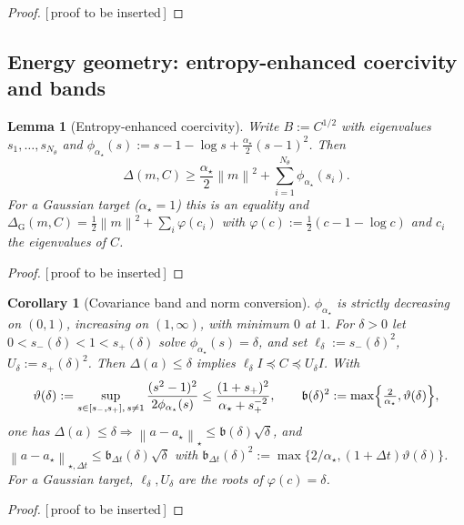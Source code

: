 \documentclass[11pt]{article}
\theoremstyle{plain}
\newtheorem{lemma}[lemma]{Lemma}
\newtheorem{corollary}[corollary]{Corollary}
\theoremstyle{definition}
\theoremstyle{remark}
\newcommand{\Id}{I}
\newcommand{\norm}[1]{\left\lVert #1\right\rVert}
\newcommand{\PROOFHOLE}{{\color{red}\textsf{[\,proof to be inserted\,]}}}
\begin{document}
\begin{proof}
\PROOFHOLE
\end{proof}

\subsection{Energy geometry: entropy-enhanced coercivity and bands}

\begin{lemma}[Entropy-enhanced coercivity]
\label{lem:entropy-coerc}
Write $B:=C^{1/2}$ with eigenvalues $s_1,\dots,s_{N_\theta}$ and
$\phi_{\alpha_\star}(s):=s-1-\log s+\tfrac{\alpha_\star}2(s-1)^2$. Then
\begin{equation}
\label{eq:entropy-coerc}
    \Delta(m,C)\geq\frac{\alpha_\star}2\norm{m}^2+\sum_{i=1}^{N_\theta}\phi_{\alpha_\star}(s_i).
\end{equation}
For a Gaussian target ($\alpha_\star=1$) this is an equality and
$\Delta_{\mathrm G}(m,C)=\tfrac12\norm{m}^2+\sum_i\varphi(c_i)$ with $\varphi(c):=\tfrac12(c-1-\log c)$
and $c_i$ the eigenvalues of $C$.
\end{lemma}

\begin{proof}
\PROOFHOLE
\end{proof}

\begin{corollary}[Covariance band and norm conversion]
\label{cor:band}
$\phi_{\alpha_\star}$ is strictly decreasing on $(0,1)$, increasing on $(1,\infty)$, with minimum
$0$ at $1$. For $\delta>0$ let $0<s_-(\delta)<1<s_+(\delta)$ solve $\phi_{\alpha_\star}(s)=\delta$,
and set $\ell_\delta:=s_-(\delta)^2$, $U_\delta:=s_+(\delta)^2$. Then $\Delta(a)\leq\delta$ implies
$\ell_\delta\Id\preceq C\preceq U_\delta\Id$. With
\[
    \vartheta(\delta):=\sup_{s\in[s_-,s_+],\,s\neq1}\frac{(s^2-1)^2}{2\phi_{\alpha_\star}(s)}
    \leq\frac{(1+s_+)^2}{\alpha_\star+s_+^{-2}},
    \qquad
    \mathfrak b(\delta)^2:=\max\Bigl\{\tfrac2{\alpha_\star},\vartheta(\delta)\Bigr\},
\]
one has $\Delta(a)\leq\delta\Rightarrow\norm{a-a_\star}_\star\leq\mathfrak b(\delta)\sqrt\delta$, and
$\norm{a-a_\star}_{\star,\Delta t}\leq\mathfrak b_{\Delta t}(\delta)\sqrt\delta$ with
$\mathfrak b_{\Delta t}(\delta)^2:=\max\{2/\alpha_\star,(1+\Delta t)\vartheta(\delta)\}$. For a
Gaussian target, $\ell_\delta,U_\delta$ are the roots of $\varphi(c)=\delta$.
\end{corollary}

\begin{proof}
\PROOFHOLE
\end{proof}
\end{document}
